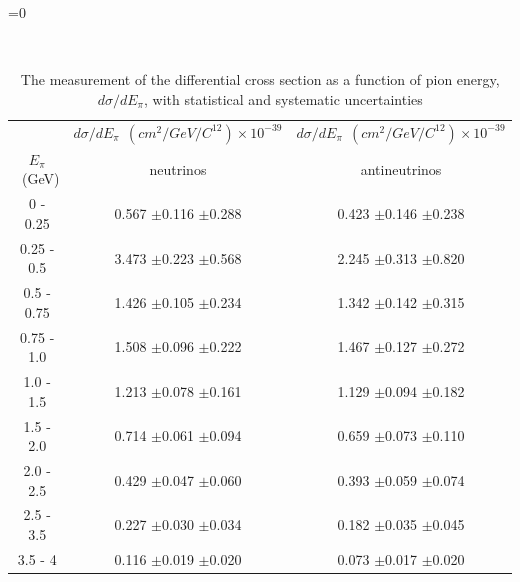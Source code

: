 \documentclass[aps,prl,twocolumn,showpacs,superscriptaddress,nofootinbib]{revtex4}
\newcommand{\PRLsupp}{0}   %
\begin{document}
\ifnum\PRLsupp=0
  \clearpage
\newcommand{\qsq}{\ensuremath{Q^2_{QE}}\xspace}
\renewcommand{\textfraction}{0.05}
\renewcommand{\topfraction}{0.95}
\renewcommand{\bottomfraction}{0.95}
\renewcommand{\floatpagefraction}{0.95}
\renewcommand{\dblfloatpagefraction}{0.95}
\renewcommand{\dbltopfraction}{0.95}
\setcounter{totalnumber}{5}
\setcounter{bottomnumber}{3}
\setcounter{topnumber}{3}
\setcounter{dbltopnumber}{3}


\onecolumngrid
{}\hfill\vspace*{4ex}\

\begingroup
\squeezetable
\begin{table}[h]
\tabcolsep=0.11cm
\begin{tabular}{c|c|c}
&  $d\sigma/dE_{\pi}\ \  (cm^{2}/GeV/C^{12})\times 10^{-39}$ & $d\sigma/dE_{\pi}\ \  (cm^{2}/GeV/C^{12})\times 10^{-39}$ \\
$E_{\pi}$ \ (GeV)& neutrinos & antineutrinos  \\
\hline

0 - 0.25 & 0.567 $\pm $0.116 $\pm$0.288 &0.423 $\pm $0.146 $\pm$0.238\\
0.25 - 0.5 & 3.473 $\pm $0.223 $\pm$0.568 &2.245 $\pm $0.313 $\pm$0.820\\
0.5 - 0.75 & 1.426 $\pm $0.105 $\pm$0.234 &1.342 $\pm $0.142 $\pm$0.315\\
0.75 - 1.0 & 1.508 $\pm $0.096 $\pm$0.222 &1.467 $\pm $0.127 $\pm$0.272\\
1.0 - 1.5 & 1.213 $\pm $0.078 $\pm$0.161 &1.129 $\pm $0.094 $\pm$0.182\\
1.5 - 2.0 & 0.714 $\pm $0.061 $\pm$0.094 &0.659 $\pm $0.073 $\pm$0.110\\
2.0 - 2.5 & 0.429 $\pm $0.047 $\pm$0.060 &0.393 $\pm $0.059 $\pm$0.074\\
2.5 - 3.5 & 0.227 $\pm $0.030 $\pm$0.034 &0.182 $\pm $0.035 $\pm$0.045\\
3.5 - 4 & 0.116 $\pm $0.019 $\pm$0.020 &0.073 $\pm $0.017 $\pm$0.020\\
 
\end{tabular}
\caption{The measurement of the differential cross section as a function of pion energy, $d\sigma/dE_\pi$, with statistical and systematic uncertainties}
\end{table}
\endgroup
\end{document}

